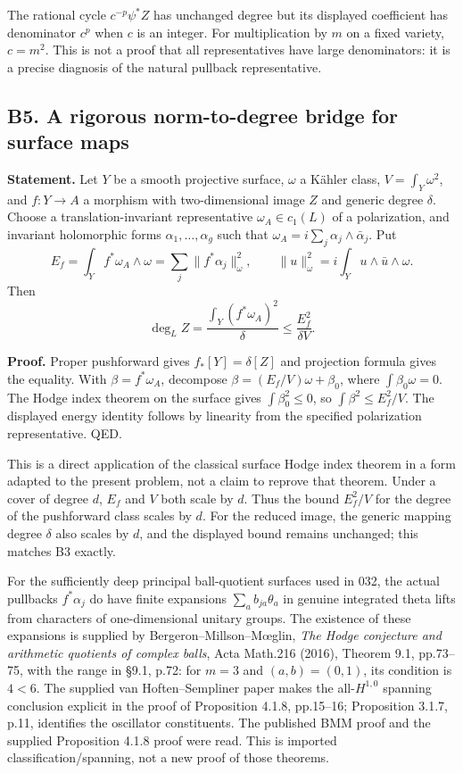 \documentclass[11pt,a4paper]{article}
\theoremstyle{definition}
\begin{document}
The rational cycle \(c^{-p}\psi^*Z\) has unchanged degree but its displayed coefficient has denominator \(c^p\) when \(c\) is an integer. For multiplication by \(m\) on a fixed variety, \(c=m^2\). This is not a proof that all representatives have large denominators: it is a precise diagnosis of the natural pullback representative.

\subsection{B5. A rigorous norm-to-degree bridge for surface maps}\label{b5.-a-rigorous-norm-to-degree-bridge-for-surface-maps}

\textbf{Statement.} Let \(Y\) be a smooth projective surface, \(\omega\) a Kähler class, \(V=\int_Y\omega^2\), and \(f:Y\to A\) a morphism with two-dimensional image \(Z\) and generic degree \(\delta\). Choose a translation-invariant representative \(\omega_A\in c_1(L)\) of a polarization, and invariant holomorphic forms \(\alpha_1,\ldots,\alpha_g\) such that \(\omega_A=i\sum_j\alpha_j\wedge\bar\alpha_j\). Put \[
 E_f=\int_Y f^*\omega_A\wedge\omega
 =\sum_j\|f^*\alpha_j\|_\omega^2,\qquad
 \|u\|_\omega^2=i\int_Yu\wedge\bar u\wedge\omega.
\] Then \[
 \deg_L Z=\frac{\int_Y(f^*\omega_A)^2}{\delta}
 \leq\frac{E_f^2}{\delta V}.
\]

\textbf{Proof.} Proper pushforward gives \(f_*[Y]=\delta[Z]\) and projection formula gives the equality. With \(\beta=f^*\omega_A\), decompose \(\beta=(E_f/V)\omega+\beta_0\), where \(\int\beta_0\omega=0\). The Hodge index theorem on the surface gives \(\int\beta_0^2\leq0\), so \(\int\beta^2\leq E_f^2/V\). The displayed energy identity follows by linearity from the specified polarization representative. QED.

This is a direct application of the classical surface Hodge index theorem in a form adapted to the present problem, not a claim to reprove that theorem. Under a cover of degree \(d\), \(E_f\) and \(V\) both scale by \(d\). Thus the bound \(E_f^2/V\) for the degree of the pushforward class scales by \(d\). For the reduced image, the generic mapping degree \(\delta\) also scales by \(d\), and the displayed bound remains unchanged; this matches B3 exactly.

For the sufficiently deep principal ball-quotient surfaces used in 032, the actual pullbacks \(f^*\alpha_j\) do have finite expansions \(\sum_a b_{ja}\theta_a\) in genuine integrated theta lifts from characters of one-dimensional unitary groups. The existence of these expansions is supplied by Bergeron--Millson--Mœglin, \emph{The Hodge conjecture and arithmetic quotients of complex balls}, Acta Math.216 (2016), Theorem 9.1, pp.73--75, with the range in §9.1, p.72: for \(m=3\) and \((a,b)=(0,1)\), its condition is \(4<6\). The supplied van Hoften--Sempliner paper makes the all-\(H^{1,0}\) spanning conclusion explicit in the proof of Proposition 4.1.8, pp.15--16; Proposition 3.1.7, p.11, identifies the oscillator constituents. The published BMM proof and the supplied Proposition 4.1.8 proof were read. This is imported classification/spanning, not a new proof of those theorems.
\end{document}
